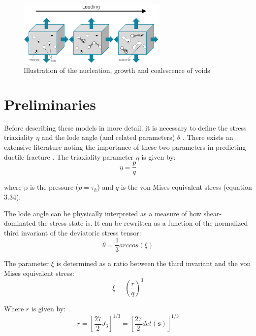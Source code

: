 \documentclass[sn-mathphys,Numbered,draft]{sn-jnl}%
\begin{document}
\begin{figure}[htb]
\begin{center}
	\includegraphics[width=0.65\textwidth]{./Figures/damageModels/f_ngc.png}
\caption{Illustration of the nucleation, growth and coalescence of voids \cite{archie_damage_2018}}
\label{fig:Nucleating Voids}
\end{center}
\end{figure}

\section{Preliminaries}
Before describing these models in more detail, it is necessary to define the stress triaxiality $\eta$ and the lode angle (and related parameters) $\theta$ \cite{bai_new_2008, nahshon_modification_2008}. There exists an extensive literature noting the importance of these two parameters in predicting ductile fracture \cite{besson_continuum_2010,cao_models_2017,tekkaya_damage_2020}. The triaxiality parameter $\eta$ is given by:
\begin{equation}
    \eta=\frac{p}{q}
\end{equation}

where p is the pressure ($p=\tau_h$) and $q$ is the von Mises equivalent stress (equation 3.34).

The lode angle can be physically interpreted as a measure of how shear-dominated the stress state is. It can be rewritten as a function of the normalized third invariant of the deviatoric stress tensor:
\begin{equation}
    \theta=\frac{1}{3}arccos\left(\xi\right)
\end{equation}

The parameter $\xi$ is determined as a ratio between the third invariant and the von Mises equivalent stress:
\begin{equation}
	\xi=\left(\frac{r}{q}\right)^3	
\end{equation}

Where $r$ is given by:
\begin{equation}
	r=\left[\frac{27}{2}J_3\right]^{1/3}=\left[\frac{27}{2}det\left(\mathbf{s}\right)\right]^{1/3}	
\end{equation}
\end{document}
